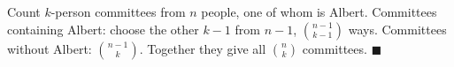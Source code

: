 Count $k$-person committees from $n$ people, one of whom is Albert. Committees containing Albert: choose the other $k-1$ from $n-1$, $\binom{n-1}{k-1}$ ways. Committees without Albert: $\binom{n-1}k$. Together they give all $\binom nk$ committees. $\blacksquare$

